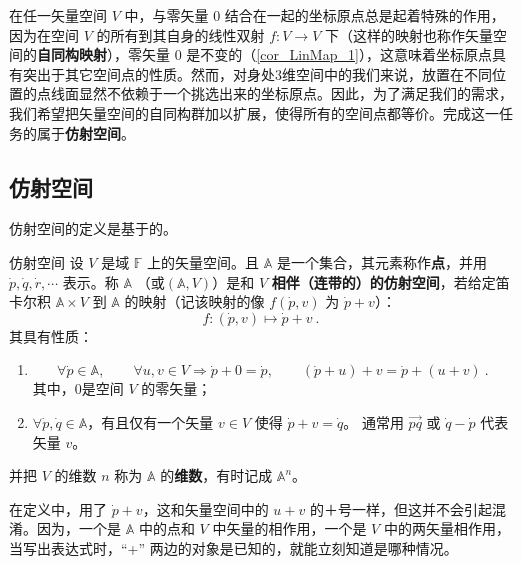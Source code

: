 

在任一矢量空间 $V$ 中，与零矢量 $0$ 结合在一起的坐标原点总是起着特殊的作用，因为在空间 $V$ 的所有到其自身的线性双射 $f:V\rightarrow V$ 下（这样的映射也称作矢量空间的\textbf{自同构映射}），零矢量 $0$ 是不变的（\autoref{cor_LinMap_1}），这意味着坐标原点具有突出于其它空间点的性质。然而，对身处3维空间中的我们来说，放置在不同位置的点线面显然不依赖于一个挑选出来的坐标原点。因此，为了满足我们的需求，我们希望把矢量空间的自同构群加以扩展，使得所有的空间点都等价。完成这一任务的属于\textbf{仿射空间}。
\subsection{仿射空间}\label{sub_AfSp_1}
仿射空间的定义是基于的。
\begin{definition}{仿射空间}\label{def_AfSp_1}
设 $V$ 是域 $\mathbb F$ 上的矢量空间。且 $\mathbb A$ 是一个集合，其元素称作\textbf{点}，并用 $\dot{p},\dot{q},\dot{r},\cdots$ 表示。称 $\mathbb A$ （或$(\mathbb A,V)$）是和 $V$ \textbf{相伴（连带的）的仿射空间}，若给定笛卡尔积 $\mathbb A\times V$ 到 $\mathbb A$ 的映射（记该映射的像 $f(\dot p,v)$ 为 $\dot p+v$）：
\begin{equation}
f:(\dot p,v)\mapsto\dot p+v~.
\end{equation}
其具有性质：
\begin{enumerate}
\item
\begin{equation}
\forall \dot p\in\mathbb A,\qquad
\forall u,v\in V\Rightarrow\dot p+0=\dot p, \qquad
(\dot p+u)+v=\dot p+(u+v)~.
\end{equation}
其中，0是空间 $V$ 的零矢量；
\item $\forall \dot p,\dot q\in\mathbb A$，有且仅有一个矢量 $v\in V$ 使得 $\dot p+v=\dot q$。 通常用 $\overrightarrow{pq}$ 或 $\dot q-\dot p$ 代表矢量 $v$。
\end{enumerate}
并把 $V$ 的维数 $n$ 称为 $\mathbb A$ 的\textbf{维数}，有时记成 $\mathbb A^n$。
\end{definition}
在定义中，用了 $\dot p+v$，这和矢量空间中的 $u+v$ 的＋号一样，但这并不会引起混淆。因为，一个是 $\mathbb A$ 中的点和 $V$ 中矢量的相作用，一个是 $V$ 中的两矢量相作用，当写出表达式时，“+” 两边的对象是已知的，就能立刻知道是哪种情况。

